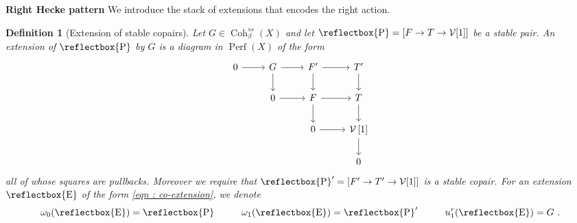 \documentclass[11pt]{article}
\newtheorem{definition}{Definition}
\newcommand{\cohbetass}{\operatorname{Coh}^{ss}_{\beta}(X)}
\newcommand{\perf}{\operatorname{Perf}(X)}
\newcommand{\framing}{\mathcal{V}}
\newcommand{\cop}{\reflectbox{\ensuremath{\operatorname{P}}}}
\newcommand{\coext}{\reflectbox{\ensuremath{\operatorname{E}}}}
\begin{document}
\noindent\textbf{Right Hecke pattern} We introduce the stack of extensions that encodes the right action.

\begin{definition}[Extension of stable copairs]\label{def : co-extension}
    Let $G\in \cohbetass$ and let $\reflectbox{\ensuremath{\operatorname{P}}} = [F\rightarrow T \rightarrow \framing[1]]$ be a stable pair. An extension of $\cop$ by $G$ is a diagram in $\perf$ of the form
\begin{equation}\label{eqn : co-extension}
    \begin{tikzcd}
    0  \arrow[r] & G  \arrow[d] \arrow[r] & F' \arrow[d] \arrow[r] & T' \arrow[d] \\ & 0 \arrow[r] & F \arrow[d] \arrow[r] & T \arrow[d]\\ & & 0 \arrow[r] & \framing\left[1\right] \arrow[d] \\ && & 0
\end{tikzcd}
\end{equation}
all of whose squares are pullbacks. Moreover we require that $\cop'=[F'\rightarrow T'\rightarrow \framing[1]]$ is a stable copair. For an extension $\coext$ of the form \eqref{eqn : co-extension}, we denote
\[
\omega_0(\coext) = \cop \hspace{1cm} \omega_1(\coext) = \cop' \hspace{1cm} u^r_1(\coext) = G\ .  
\]
\end{definition}
\end{document}
